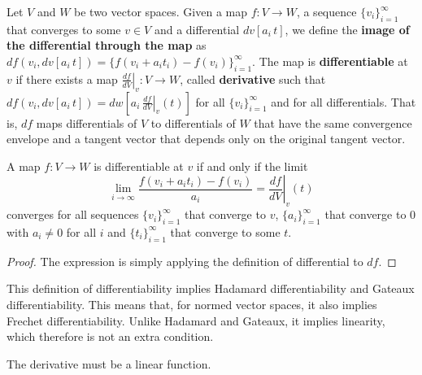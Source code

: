 \documentclass[11pt,letterpaper,fleqn]{memoir}
\begin{document}
\begin{defn}
	Let $V$ and $W$ be two vector spaces. Given a map $f: V \to W$, a sequence $\{v_i\}_{i=1}^{\infty}$ that converges to some $v \in V$ and a differential $dv[a_i \, t]$, we define the \textbf{image of the differential through the map} as $df(v_i, dv[a_i \, t]) = \{f(v_i + a_i t_i) - f(v_i)\}_{i=1}^{\infty}$. The map is \textbf{differentiable} at $v$ if there exists a map $\left.\frac{df}{dV} \right|_{v}: V \to W$, called \textbf{derivative} such that $df(v_i, dv[a_i \, t]) = dw[a_i \, \left.\frac{df}{dV} \right|_{v} (t)]$ for all $\{v_i\}_{i=1}^{\infty}$ and for all differentials. That is, $df$ maps differentials of $V$ to differentials of $W$ that have the same convergence envelope and a tangent vector that depends only on the original tangent vector.
\end{defn}

\begin{prop}
	A map $f : V \to W$ is differentiable at $v$ if and only if the limit
	$$ \lim\limits_{i \to \infty} \frac{f(v_i + a_i t_i) - f(v_i)}{a_i} = \left.\frac{df}{dV} \right|_{v} (t)$$
	converges for all sequences $\{v_i\}_{i=1}^{\infty}$ that converge to $v$, $\{a_i\}_{i=1}^{\infty}$ that converge to $0$ with $a_i \neq 0$ for all $i$ and $\{t_i\}_{i=1}^{\infty}$ that converge to some $t$.
\end{prop}

\begin{proof}
	The expression is simply applying the definition of differential to $df$.
\end{proof}

\begin{remark}
	This definition of differentiability implies Hadamard differentiability and Gateaux differentiability. This means that, for normed vector spaces, it also implies Frechet differentiability. Unlike Hadamard and Gateaux, it implies linearity, which therefore is not an extra condition.
\end{remark}

\begin{prop}
	The derivative must be a linear function.
\end{prop}
\end{document}

